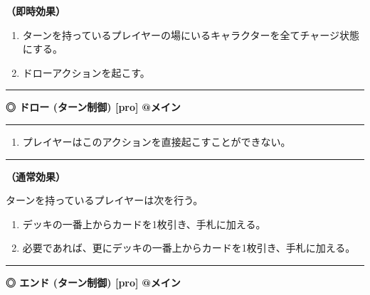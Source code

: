 \documentclass[twocolumn,a5paper,papersize,10pt]{jarticle}
\begin{document}
{\bf（即時効果）}


\vspace{-1zh}%
\begin{enumerate}
\setlength{\leftskip}{-0.3cm}
\setlength{\parskip}{0pt} %

\item ターンを持っているプレイヤーの場にいるキャラクターを全てチャージ状態にする。

\item ドローアクションを起こす。
\vspace{-1zh}%
\end{enumerate}
\vspace{2mm} %
\hrule height 0.5mm depth 0mm width 66.5mm %
\vspace{1mm} %
{\small\bf ◎ ドロー {\scriptsize (ターン制御) [pro]}} %
\hfill 
{\footnotesize\bf @メイン }


\vspace{1mm}%
\hrule height 0.1mm depth 0mm width 66.5mm %
\vspace{1mm}%


\vspace{-1zh}%
\begin{enumerate}
\renewcommand{\labelenumi}{※}
\setlength{\leftskip}{-0.3cm}
\setlength{\itemsep}{0pt} %
\setlength{\parskip}{0pt} %

\item プレイヤーはこのアクションを直接起こすことができない。

\vspace{-3mm}%
\end{enumerate}
\vspace{1mm}%
\hrule height 0.1mm depth 0mm width 66.5mm %
\vspace{1mm}%

{\bf（通常効果）}

ターンを持っているプレイヤーは次を行う。


\vspace{-1zh}%
\begin{enumerate}
\setlength{\leftskip}{-0.3cm}
\setlength{\parskip}{0pt} %

\item デッキの一番上からカードを1枚引き、手札に加える。

\item 必要であれば、更にデッキの一番上からカードを1枚引き、手札に加える。
\vspace{-1zh}%
\end{enumerate}
\vspace{2mm} %
\hrule height 0.5mm depth 0mm width 66.5mm %
\vspace{1mm} %
{\small\bf ◎ エンド {\scriptsize (ターン制御) [pro]}} %
\hfill 
{\footnotesize\bf @メイン }
\end{document}
